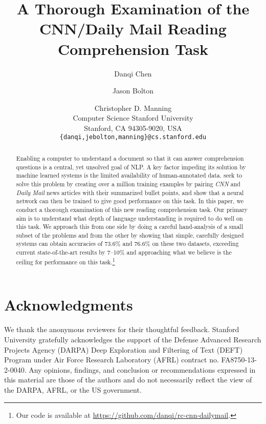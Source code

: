 \documentclass[11pt]{article}
\title{A Thorough Examination of the \\ CNN\slash Daily Mail Reading Comprehension Task}
\author{Danqi Chen \and Jason Bolton \and Christopher D. Manning\\
            Computer Science
	    Stanford University\\
	    Stanford, CA 94305-9020, USA\\
	    {\tt \{danqi,jebolton,manning\}@cs.stanford.edu}}
\date{}
\newcommand{\ti}[1]{\textit{#1}}
\newcommand{\finalcnn}{73.6\%}
\newcommand{\finaldm}{76.6\%}
\begin{document}
\def\tinyweeny{\fontsize{6pt}{8pt}\selectfont}

\maketitle

\begin{abstract}

Enabling a computer to understand a document so that it can answer comprehension questions is a central, yet unsolved goal of NLP\@. A key factor impeding its solution by machine learned systems is the limited availability of human-annotated data.  seek to solve this problem by creating over a million training examples by pairing \ti{CNN} and \ti{Daily Mail} news articles with their summarized bullet points, and show that a neural network can then be trained to give good performance on this task. In this paper, we conduct a thorough examination of this new reading comprehension task. Our primary aim is to understand what depth of language understanding is required to do well on this task. We approach this from one side by doing a careful hand-analysis of a small subset of the problems and from the other by showing that simple, carefully designed systems can obtain accuracies of {\finalcnn} and {\finaldm} on these two datasets, exceeding current state-of-the-art results by {7}--{10}\%  and approaching what we believe is the ceiling for performance on this task.\footnote{Our code is available at \url{https://github.com/danqi/rc-cnn-dailymail}.}
\end{abstract}



% 







\section*{Acknowledgments}

We thank the anonymous reviewers for their thoughtful feedback. Stanford University gratefully acknowledges the support of the Defense Advanced Research Projects Agency (DARPA) Deep Exploration and Filtering of Text (DEFT) Program under Air Force Research Laboratory (AFRL) contract no. FA8750-13-2-0040. Any opinions, findings, and conclusion or recommendations expressed in this material are those of the authors and do not necessarily reflect the view of the DARPA, AFRL, or the US government.




\appendix

\end{document}
